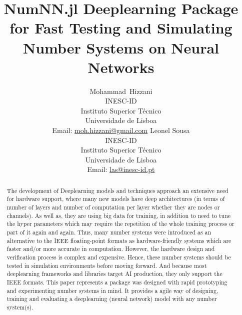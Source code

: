 \documentclass{article}
\title{NumNN.jl Deeplearning Package for Fast Testing and Simulating Number Systems on Neural Networks}
\author{%
	{Mohammad~Hizzani}\\
	{INESC-ID\\ Instituto Superior Técnico\\ Universidade de Lisboa\\
		Email: \href{mailto:moh.hizzani@gmail.com}{moh.hizzani@gmail.com}}
	\AND
	{Leonel Sousa}\\
	{INESC-ID\\ Instituto Superior Técnico\\ Universidade de Lisboa\\
		Email: \href{mailto:las@inesc-id.pt}{las@inesc-id.pt}}
}
\begin{document}
	\maketitle

	\begin{abstract}
		The development of Deeplearning models and techniques approach an extensive need for hardware support, where many new models have deep architectures (in terms of number of layers and number of computation per layer whether they are nodes or channels). As well as, they are using big data for training, in addition to need to tune the hyper parameters which may require the repetition of the whole training process or part of it again and again. Thus, many number systems were introduced as an alternative to the IEEE floating-point formats as hardware-friendly systems which are faster and/or more accurate in computation. However, the hardware design and verification process is complex and expensive. Hence, these number systems should be tested in simulation environments before moving forward. And because most deeplearning frameworks and libraries target AI production, they only support the IEEE formats. This paper represents a package was designed with rapid prototyping and experimenting number systems in mind. It provides a agile way of designing, training and evaluating a deeplearning (neural network) model with any number system(s).
	\end{abstract}

	
	
	
	
	
%	
	
	
	
\end{document}

